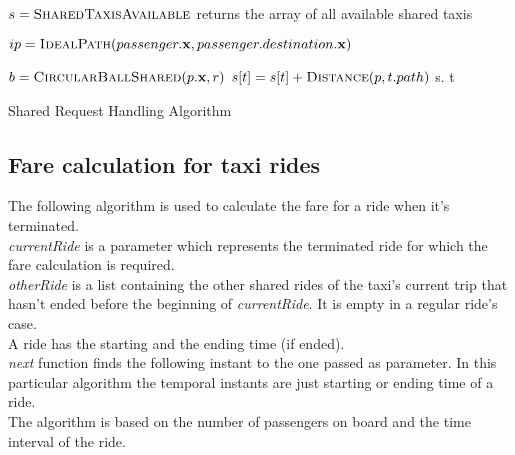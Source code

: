 \begin{algorithm}[]
\begin{algorithmic}[1]


\State $ s = \Call{SharedTaxisAvailable}{}$ \Comment returns the array of all available shared taxis

\State $ ip = \Call{IdealPath}{passenger.{\bf x}, passenger.destination.{\bf x}}$ 

   \State $ b = \Call{CircularBallShared} {p.{\bf x}, r} $
        \State $ s[t] = s[t] + \Call{Distance}{p, t.path}$
   \EndFor
\EndFor
   \State s.%
            \State \Return t
        \EndIf
   \EndFor
   \State \Return {}
\EndFunction

\end{algorithmic}
\caption{
    \label{alg:shdreqhandler} Shared Request Handling Algorithm}
\end{algorithm}

\newpage

\subsection{Fare calculation for taxi rides}
The following algorithm is used to calculate the fare for a ride when it's terminated.\\
\textit{currentRide} is a parameter which represents the terminated ride for which the fare calculation is required.\\
\textit{otherRide} is a list containing the other shared rides of the taxi's current trip that hasn't ended before the beginning of \textit{currentRide}. It is empty in a regular ride's case.\\
A ride has the starting and the ending time (if ended).\\
\textit{next} function finds the following instant to the one passed as parameter. In this particular algorithm the temporal instants are just starting or ending time of a ride.\\
The algorithm is based on the number of passengers on board and the time interval of the ride.


